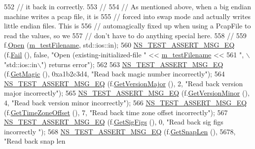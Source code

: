 \begin{DoxyCode}
552   \textcolor{comment}{// it back in correctly.}
553   \textcolor{comment}{//}
554   \textcolor{comment}{// As mentioned above, when a big endian machine writes a pcap file, it is }
555   \textcolor{comment}{// forced into swap mode and actually writes little endian files.  This is }
556   \textcolor{comment}{// automagically fixed up when using a PcapFile to read the values, so we }
557   \textcolor{comment}{// don't have to do anything special here.}
558   \textcolor{comment}{//}
559   f.\hyperlink{classns3_1_1PcapFile_a064e8494e28e823d0bb4e40549f9f483}{Open} (\hyperlink{classFileHeaderTestCase_a4ab3078ae75680fcc90a3eca9f273cd2}{m\_testFilename}, std::ios::in);
560   \hyperlink{group__testing_ga2a9d78cffb3db8e867c35fff0b698cf5}{NS\_TEST\_ASSERT\_MSG\_EQ} (f.\hyperlink{classns3_1_1PcapFile_a2e00aa080890a0c9c3e9f5bd2d6c21d5}{Fail} (), \textcolor{keyword}{false}, \textcolor{stringliteral}{"Open (existing-initialized-file "} << 
      \hyperlink{classFileHeaderTestCase_a4ab3078ae75680fcc90a3eca9f273cd2}{m\_testFilename} << 
561                          \textcolor{stringliteral}{", \(\backslash\)"std::ios::in\(\backslash\)") returns error"});
562 
563   \hyperlink{group__testing_ga2a9d78cffb3db8e867c35fff0b698cf5}{NS\_TEST\_ASSERT\_MSG\_EQ} (f.\hyperlink{classns3_1_1PcapFile_ac32dd628aa09604ae0280ad87bafe105}{GetMagic} (), 0xa1b2c3d4, \textcolor{stringliteral}{"Read back magic number
       incorrectly"});
564   \hyperlink{group__testing_ga2a9d78cffb3db8e867c35fff0b698cf5}{NS\_TEST\_ASSERT\_MSG\_EQ} (f.\hyperlink{classns3_1_1PcapFile_a182c0d559994abde0e1c5691bbb6f2bd}{GetVersionMajor} (), 2, \textcolor{stringliteral}{"Read back version
       major incorrectly"});
565   \hyperlink{group__testing_ga2a9d78cffb3db8e867c35fff0b698cf5}{NS\_TEST\_ASSERT\_MSG\_EQ} (f.\hyperlink{classns3_1_1PcapFile_aec2a5893556ce03eface12adc8ef200d}{GetVersionMinor} (), 4, \textcolor{stringliteral}{"Read back version
       minor incorrectly"});
566   \hyperlink{group__testing_ga2a9d78cffb3db8e867c35fff0b698cf5}{NS\_TEST\_ASSERT\_MSG\_EQ} (f.\hyperlink{classns3_1_1PcapFile_af2f76f02140b0cd7820f630382626d51}{GetTimeZoneOffset} (), 7, \textcolor{stringliteral}{"Read back time
       zone offset incorrectly"});
567   \hyperlink{group__testing_ga2a9d78cffb3db8e867c35fff0b698cf5}{NS\_TEST\_ASSERT\_MSG\_EQ} (f.\hyperlink{classns3_1_1PcapFile_a7074106d671684484d083f5970723c07}{GetSigFigs} (), 0, \textcolor{stringliteral}{"Read back sig figs incorrectly
      "});
568   \hyperlink{group__testing_ga2a9d78cffb3db8e867c35fff0b698cf5}{NS\_TEST\_ASSERT\_MSG\_EQ} (f.\hyperlink{classns3_1_1PcapFile_a1ad2956ada10389364ee11fae1937e6b}{GetSnapLen} (), 5678, \textcolor{stringliteral}{"Read back snap len
}
\end{DoxyCode}

